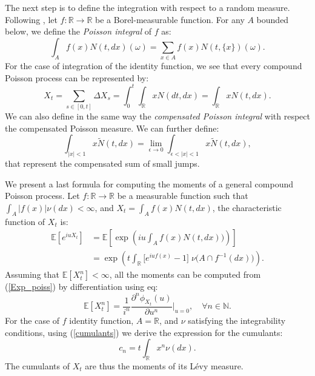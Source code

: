 \documentclass[]{interact}
\newcommand{\numberset}{\mathbb}
\newcommand{\N}{\numberset{N}}
\newcommand{\R}{\numberset{R}}
\newcommand{\E}{\numberset{E}}
\theoremstyle{plain}%
\theoremstyle{definition}
\theoremstyle{remark}
\begin{document}
The next step is to define the integration with respect to a random measure.
Following \cite{Applebaum}, let $f:\R \to \R$ be a Borel-measurable
function. For any $A$ bounded below, we define the \emph{Poisson integral} of $f$ as:
 \begin{equation}\label{Poisson_int}
  \int_A f(x) N(t,dx)(\omega) = \sum_{x\in A} f(x) N(t,\{x\})(\omega). 
 \end{equation}
For the case of integration of the identity function, we see that every compound Poisson process can be represented by:
\begin{equation}\label{compound_P}
 X_t = \sum_{s\in [0,t]} \Delta X_s = \int_0^t \int_{\R} x N(dt,dx) = \int_{\R} x N(t,dx).
\end{equation}
We can also define in the same way the \emph{compensated Poisson integral} with respect the compensated Poisson measure.
We can further define:
\begin{equation}
\int_{|x|<1} x \tilde N(t,dx) = \lim_{\epsilon \to 0} \int_{\epsilon < |x| < 1} x \tilde N(t,dx), 
\end{equation}
that represent the compensated sum of small jumps.

We present a last formula for computing the moments of a general compound Poisson process.
Let $f: \R \to \R$ be a measurable function such that $\int_A |f(x)| \nu(dx) < \infty$, and $ X_t = \int_A f(x) N(t,dx)$, the characteristic function of $X_t$ is:
 \begin{align}\label{Exp_poiss}
 \E[ e^{iuX_t} ] &= 
  \E \left[ \exp \left( i u \int_A f(x) N(t,dx)) \right) \right] \\ \nonumber
  &= \exp \left( t \int_{\R} \bigl[ e^{iu f(x)}-1 \bigr] \; \nu \bigl( A \cap f^{-1}(dx)\bigr) \right).
 \end{align}
Assuming that $\E[X_t^n] < \infty$, all the moments can be computed from (\ref{Exp_poiss}) by differentiation using eq:
\begin{equation}\label{moments}
 \E[X_t^{n}] = \frac{1}{i^n} \frac{\partial^n \phi_{X_t}(u)}{\partial u^{n}} \biggr|_{u=0}, \quad \forall n \in \N .
\end{equation}
For the case of $f$ identity function, $A=\R$, and $\nu$ satisfying the integrability conditions, using (\ref{cumulants}) we derive the expression for the cumulants: 
\begin{equation}\label{levy_cumulants}
 c_n = t \int_{\R} x^n \nu(dx). 
\end{equation}
The cumulants of $X_t$ are thus the moments of its Lévy measure. 
\end{document}
